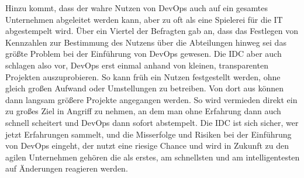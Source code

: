 Hinzu kommt, dass der wahre Nutzen von \ac{DevOps} auch auf ein gesamtes Unternehmen abgeleitet werden kann, aber zu oft als eine Spielerei für die IT abgestempelt wird. Über ein Viertel der Befragten gab an, dass das Festlegen von Kennzahlen zur Bestimmung des Nutzens über die Abteilungen hinweg sei das größte Problem bei der Einführung von \ac{DevOps} gewesen. Die \ac{IDC} aber auch \citeauthor*{halstenberg:2020} \cite{halstenberg:2020} schlagen also vor, \ac{DevOps} erst einmal anhand von kleinen, transparenten Projekten auszuprobieren. So kann früh ein Nutzen festgestellt werden, ohne gleich großen Aufwand oder Umstellungen zu betreiben. Von dort aus können dann langsam größere Projekte angegangen werden. So wird vermieden direkt ein zu großes Ziel in Angriff zu nehmen, an dem man ohne Erfahrung dann auch schnell scheitert und \ac{DevOps} dann sofort abstempelt. Die \ac{IDC} ist sich sicher, wer jetzt Erfahrungen sammelt, und die Misserfolge und Risiken bei der Einführung von \ac{DevOps} eingeht, der nutzt eine riesige Chance und wird in Zukunft zu den agilen Unternehmen gehören \glqq die als erstes, am schnellsten und am intelligentesten auf Änderungen reagieren werden.\grqq \cite{idc:2020}
